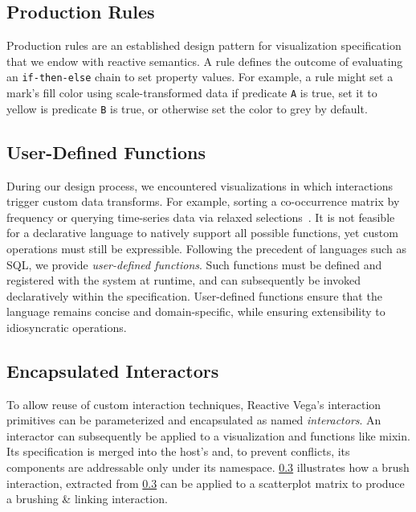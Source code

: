 \subsection{Production Rules}

Production rules are an established design pattern for visualization
specification~\cite{heer:designpatterns} that we endow with reactive semantics.
A rule defines the outcome of evaluating an \texttt{if-then-else} chain to set
property values. For example, a rule might set a mark's fill color using
scale-transformed data if predicate \texttt{A} is true, set it to yellow is
predicate \texttt{B} is true, or otherwise set the color to grey by default.

\subsection{User-Defined Functions}

During our design process, we encountered visualizations in which interactions
trigger custom data transforms. For example, sorting a co-occurrence matrix by
frequency or querying time-series data via relaxed
selections~\cite{holz:relaxed}. It is not feasible for a declarative language to
natively support all possible functions, yet custom operations must still be
expressible. Following the precedent of languages such as SQL, we provide
\emph{user-defined functions}. Such functions must be defined and registered
with the system at runtime, and can subsequently be invoked declaratively within
the specification. User-defined functions ensure that the language remains
concise and domain-specific, while ensuring extensibility to idiosyncratic
operations.

\subsection{Encapsulated Interactors}

To allow reuse of custom interaction techniques, Reactive Vega's interaction
primitives can be parameterized and encapsulated as named \emph{interactors}.
An interactor can subsequently be applied to a visualization and functions like
mixin. Its specification is merged into the host's and, to prevent conflicts,
its components are addressable only under its namespace. \cref{}
 illustrates how a brush interaction, extracted from
\cref{} can be applied to a scatterplot matrix to produce
a brushing \& linking interaction.
